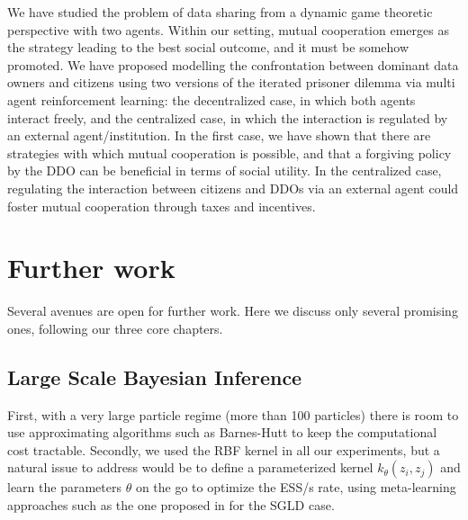 
We have studied the problem of data sharing
from a dynamic game theoretic perspective with two agents.
Within our setting,  mutual cooperation emerges as the strategy 
leading to the best social outcome, and it must be somehow promoted. We
have proposed modelling the confrontation between dominant data owners and citizens using two versions of the iterated prisoner dilemma via  
multi agent reinforcement learning: the decentralized case, in which both agents interact freely, and the centralized case, in which the interaction is regulated by an external agent/institution. In the first case, we have shown that there are strategies with which mutual cooperation is possible, and that a forgiving policy by the DDO can be beneficial in terms of social utility. In the centralized case, regulating the interaction between citizens and DDOs via an external agent could foster mutual cooperation through taxes and incentives.


\section{Further work}
Several avenues are open for further work. Here we discuss only several promising ones, following our three core chapters.


\subsection{Large Scale Bayesian Inference}
 First, with a very large particle regime (more than 100 particles) there is room to use approximating algorithms such as Barnes-Hutt to keep the computational cost tractable.
Secondly, we used the RBF kernel in all our experiments, but a natural 
issue to address would be to define a parameterized kernel $k_{\theta} (z_i, z_j)$ and learn the parameters $\theta$ on the go to optimize the ESS/s rate, using meta-learning approaches such as the one proposed in \textcite{gallego2019vis} for the SGLD case.

